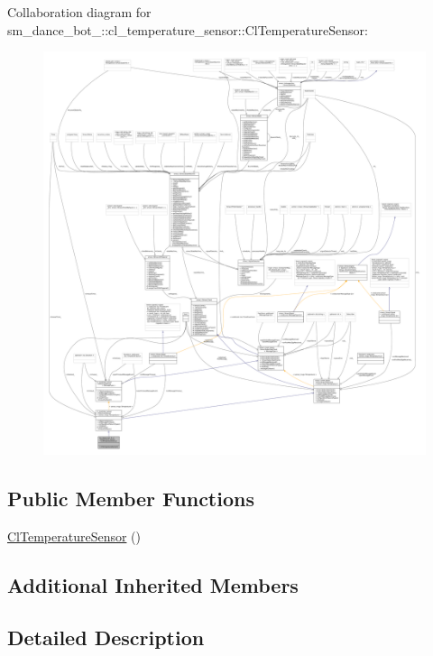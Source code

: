 Collaboration diagram for sm\+\_\+dance\+\_\+bot\+\_\+:\+:cl\+\_\+temperature\+\_\+sensor\+:\+:Cl\+Temperature\+Sensor\+:
\nopagebreak
\begin{figure}[H]
\begin{center}
\leavevmode
\includegraphics[width=350pt]{classsm__dance__bot__2_1_1cl__temperature__sensor_1_1ClTemperatureSensor__coll__graph}
\end{center}
\end{figure}
\subsection*{Public Member Functions}
\begin{DoxyCompactItemize}
\item 
\hyperlink{classsm__dance__bot__2_1_1cl__temperature__sensor_1_1ClTemperatureSensor_ac7c33050a8330c985eaf7a7539d9ea55}{Cl\+Temperature\+Sensor} ()
\end{DoxyCompactItemize}
\subsection*{Additional Inherited Members}


\subsection{Detailed Description}


